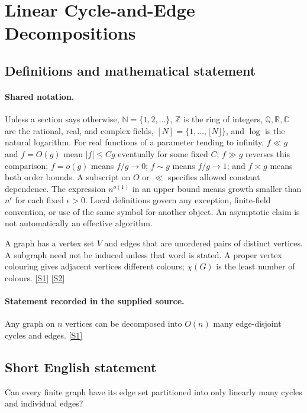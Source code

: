 \documentclass[11pt,a4paper]{article}
\newcommand{\N}{\mathbb{N}}
\newcommand{\Z}{\mathbb{Z}}
\newcommand{\Q}{\mathbb{Q}}
\newcommand{\R}{\mathbb{R}}
\newcommand{\C}{\mathbb{C}}
\newcommand{\sref}[2]{\hyperlink{source:#1:#2}{[S#2]}}
\begin{document}
\section{Linear Cycle-and-Edge Decompositions}\label{statement}


\subsection{Definitions and mathematical statement}

\paragraph{Shared notation.}Unless a section says otherwise, $\N=\{1,2,\ldots\}$,
$\Z$ is the ring of integers, $\Q,\R,\C$ are the rational, real, and complex
fields, $[N]=\{1,\ldots,\lfloor N\rfloor\}$, and $\log$ is the natural
logarithm. For real functions of a parameter tending to infinity,
$f\ll g$ and $f=O(g)$ mean $|f|\leq Cg$ eventually for some fixed $C$;
$f\gg g$ reverses this comparison; $f=o(g)$ means $f/g\to0$;
$f\sim g$ means $f/g\to1$; and $f\asymp g$ means both order bounds.
A subscript on $O$ or $\ll$ specifies allowed constant dependence.
The expression $n^{o(1)}$ in an upper bound means growth smaller than
$n^\epsilon$ for each fixed $\epsilon>0$. Local definitions govern any
exception, finite-field convention, or use of the same symbol for another
object. An asymptotic claim is not automatically an effective algorithm.



A graph has a vertex set $V$ and edges that are unordered pairs of distinct vertices. A subgraph need not be induced unless that word is stated. A proper vertex colouring gives adjacent vertices different colours; $\chi(G)$ is the least number of colours. \sref{statement}{1} \sref{statement}{2}

\paragraph{Statement recorded in the supplied source.}
Any graph on $n$ vertices can be decomposed into $O(n)$ many edge-disjoint cycles and edges. \sref{statement}{1}

\subsection{Short English statement}

Can every finite graph have its edge set partitioned into only linearly many cycles and individual edges?
\end{document}
